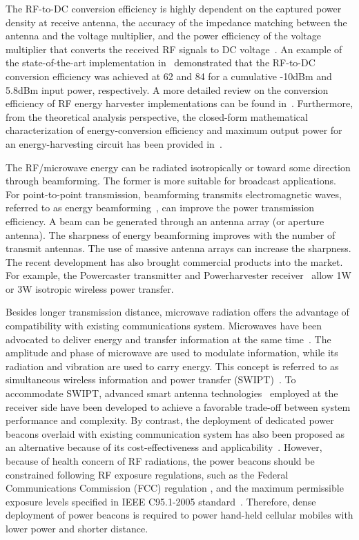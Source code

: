 \documentclass[twocolumn,10pt]{IEEEtran}
\begin{document}
The RF-to-DC conversion efficiency is highly dependent on the captured power density at receive antenna, the accuracy of the impedance matching between the antenna and the voltage multiplier, and the power efficiency of the voltage multiplier that converts the received RF signals to DC voltage~\cite{S.2013Ladan}.
An example of the state-of-the-art implementation in~\cite{V.2015Kuhn} demonstrated that the RF-to-DC conversion efficiency was achieved at 62 and 84 for a cumulative -10dBm and 5.8dBm input power, respectively. A more detailed review on the conversion efficiency of RF energy harvester implementations can be found in~\cite{X.LuSurvey,R.2014Valenta}.
Furthermore, from the theoretical analysis perspective, the closed-form mathematical characterization of energy-conversion efficiency and maximum output power for an energy-harvesting circuit has been provided in~\cite{R.2015Valenta}.


The RF/microwave energy can be radiated isotropically or toward some direction through beamforming. The former is more suitable for broadcast applications. For point-to-point transmission, beamforming transmits electromagnetic waves, referred to as energy beamforming~\cite{ZhangRuiMIMO}, can improve the power transmission efficiency. A beam can be generated through an antenna array (or aperture antenna). The sharpness of energy beamforming improves with the number of transmit antennas. The use of massive antenna arrays can increase the sharpness. The recent development has also brought commercial products into the market. For example, the Powercaster transmitter and Powerharvester receiver~\cite{Powercast} allow 1W or 3W isotropic wireless power transfer.

Besides longer transmission distance, microwave radiation offers the advantage of compatibility with existing communications system. Microwaves have been advocated to deliver energy and transfer information at the same time~\cite{Varshney2008}. The amplitude and phase of microwave are used to modulate information, while its radiation and vibration are used to carry energy. This concept is referred to as simultaneous wireless information and power transfer (SWIPT)~\cite{ZhangRuiMIMO}. To accommodate SWIPT, advanced smart antenna technologies~\cite{Z.Ding2015} employed at the receiver side have been developed to achieve a favorable trade-off between system performance and complexity.  By contrast, the deployment of dedicated power beacons overlaid with existing communication system has also been proposed as an alternative because of its cost-effectiveness and applicability~\cite{K1207.5640Huang}. However, because of health concern of RF radiations, the power beacons should be constrained following RF exposure regulations, such as the Federal Communications Commission (FCC) regulation \cite{FCC}, and the maximum permissible exposure levels specified in IEEE C95.1-2005 standard~\cite{MPE}. Therefore, dense deployment of power beacons is required to power hand-held cellular mobiles with lower power and shorter distance. 
\end{document}
